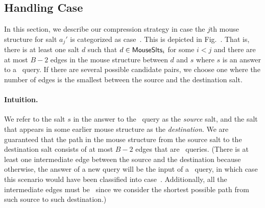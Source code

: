   

\subsection{Handling Case~}
\label{sec:somerep}
\ifnum{}
\fammousefig
\fi
In this section, we describe our compression strategy in case the $j$th mouse structure for salt $a_j'$ is categorized as case~. \ifnum{} This is depicted in Fig.~. \fi
That is, there is at least one salt $d$ such that $d\in \mathsf{MouseSlts}_i$ for some $i<j$ and there are at most $B-2$ edges in the mouse structure between $d$ and $s$ where $s$ is an answer to a \new\ query. If there are several possible candidate pairs, we choose one where the number of edges is the smallest between the source and the destination salt.



\paragraph{Intuition.} We refer to the salt $s$ in the answer to the \new\ query as the \emph{source} salt, and the salt that appears in some earlier mouse structure as the \emph{destination}. We are guaranteed that the path in the mouse structure from the source salt to the destination salt consists of at most $B-2$ edges that are \urep\ queries. (There is at least one intermediate edge between the source and the destination because otherwise, the answer of a new query will be the input of a \frep\ query,  in which case this scenario would have been classified into case~. Additionally, all the intermediate edges must be \urep\ since we consider the shortest possible path from such source to such destination.) 



